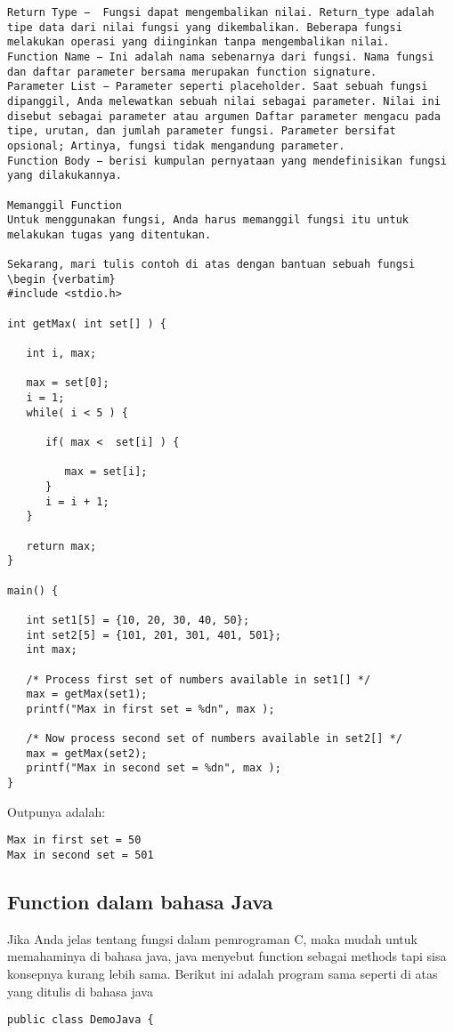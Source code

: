 \begin{enumerate}
\begin {verbatim}
Return Type −  Fungsi dapat mengembalikan nilai. Return_type adalah tipe data dari nilai fungsi yang dikembalikan. Beberapa fungsi melakukan operasi yang diinginkan tanpa mengembalikan nilai.
Function Name − Ini adalah nama sebenarnya dari fungsi. Nama fungsi dan daftar parameter bersama merupakan function signature.
Parameter List − Parameter seperti placeholder. Saat sebuah fungsi dipanggil, Anda melewatkan sebuah nilai sebagai parameter. Nilai ini disebut sebagai parameter atau argumen Daftar parameter mengacu pada tipe, urutan, dan jumlah parameter fungsi. Parameter bersifat opsional; Artinya, fungsi tidak mengandung parameter.
Function Body − berisi kumpulan pernyataan yang mendefinisikan fungsi yang dilakukannya.

Memanggil Function
Untuk menggunakan fungsi, Anda harus memanggil fungsi itu untuk melakukan tugas yang ditentukan.

Sekarang, mari tulis contoh di atas dengan bantuan sebuah fungsi
\begin {verbatim}
#include <stdio.h>
 
int getMax( int set[] ) {
 
   int i, max;
    
   max = set[0];
   i = 1;    
   while( i < 5 ) {
   
      if( max <  set[i] ) {
     
         max = set[i];
      }
      i = i + 1;
   }
     
   return max;
}
 
main() {
 
   int set1[5] = {10, 20, 30, 40, 50};
   int set2[5] = {101, 201, 301, 401, 501};
   int max;
 
   /* Process first set of numbers available in set1[] */
   max = getMax(set1);
   printf("Max in first set = %
     
   /* Now process second set of numbers available in set2[] */
   max = getMax(set2);
   printf("Max in second set = %
}
\end {verbatim}
Outpunya adalah: 
\begin {verbatim}
Max in first set = 50
Max in second set = 501
\end {verbatim}

\subsection {Function dalam bahasa Java}
Jika Anda jelas tentang fungsi dalam pemrograman C, maka mudah untuk memahaminya di bahasa java, java menyebut function sebagai methods tapi sisa konsepnya kurang lebih sama. 
Berikut ini adalah program sama seperti di atas yang ditulis di bahasa java 
\begin {verbatim}
public class DemoJava {
     

\end{verbatim}
\end{enumerate}
